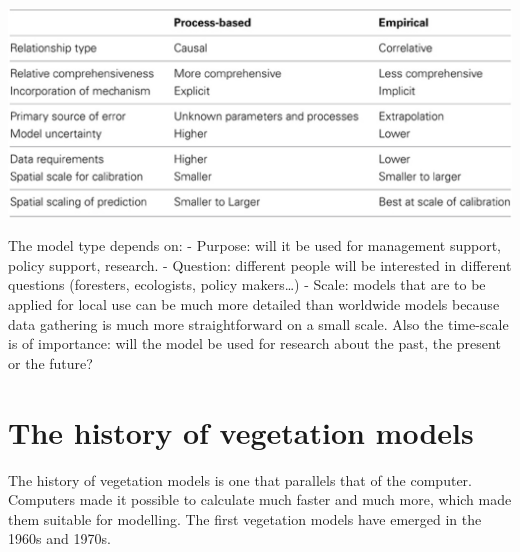 \documentclass[
  12pt,
  oneside]{book}
\begin{document}
\begin{center}
\label{table:empiricial}

\begin{center}\includegraphics[width=0.8\linewidth]{figures/chap1/tables_PB_empirical} \end{center}
\end{center}

The model type depends on:
- Purpose: will it be used for management support, policy support, research.
- Question: different people will be interested in different questions (foresters, ecologists, policy makers\ldots)
- Scale: models that are to be applied for local use can be much more detailed than worldwide models because data gathering is much more straightforward on a small scale. Also the time-scale is of importance: will the model be used for research about the past, the present or the future?

\hypertarget{the-history-of-vegetation-models}{%
\section{The history of vegetation models}\label{the-history-of-vegetation-models}}

The history of vegetation models is one that parallels that of the computer. Computers made it possible to calculate much faster and much more, which made them suitable for modelling. The first vegetation models have emerged in the 1960s and 1970s.
\end{document}
